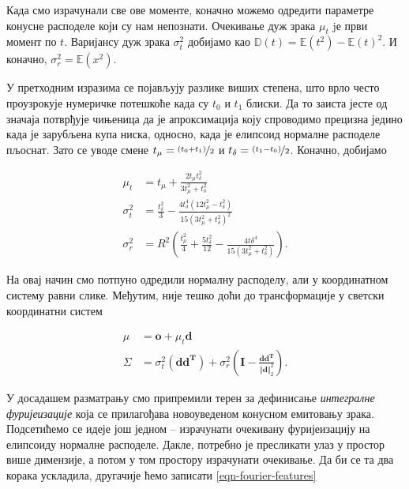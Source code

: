 \documentclass[12pt, a4paper, twoside]{book}
\numberwithin{equation}{chapter}
\numberwithin{theorem}{section}
\numberwithin{definition}{section}
\numberwithin{definitionChapter}{chapter}
\begin{document}
Када смо израчунали све ове моменте, коначно можемо одредити параметре конусне расподеле који су нам непознати.
Очекивање дуж зрака $\mu_t$ jе први момент по $t$. Варијансу дуж зрака $\sigma_t^2$ добијамо
као $\mathbb{D}(t) = \mathbb{E}(t^2) - \mathbb{E}(t)^2$. И коначно, $\sigma_r^2 = \mathbb{E}(x^2)$.

У претходним изразима се појављују разлике виших степена, што врло често проузрокује нумеричке потешкоће
када су $t_0$ и $t_1$ блиски. Да то заиста јесте од значаја потврђује чињеница да је апроксимација коју
спроводимо прецизна једино када је зарубљена купа ниска, односно, када је елипсоид нормалне расподеле пљоснат.
Зато се уводе смене $t_\mu = \nicefrac{(t_0 + t_1)}{2}$ и $t_\delta = \nicefrac{(t_1 - t_0)}{2}$.
Коначно, добијамо

\begin{equation}
	\begin{split}
		\mu_t & = t_\mu + \frac{2t_\mu t_\delta^2}{3t_\mu^2 + t_\delta^2} \\
		\sigma_t^2 & = \frac{t_\delta^2}{3} - \frac{4t_\delta^4(12t_\mu^2 - t_\delta^2)}{15(3t_\mu^2 + t_\delta^2)^2} \\
		\sigma_r^2 & = R^2 \left(\frac{t_\mu^2}{4} + \frac{5t_\delta^2}{12} - \frac{4t\delta^4}{15(3t_\mu^2 + t_\delta^2)}\right).
	\end{split}
\end{equation}

На овај начин смо потпуно одредили нормалну расподелу, али у координатном систему равни слике. Међутим,
није тешко доћи до трансформације у светски координатни систем

\begin{equation}
	\begin{split}
		\mu & = \mathbf{o} + \mu_t\mathbf{d} \\
		\Sigma & = \sigma_t^2\left(\mathbf{d}\mathbf{d^T}\right) +
			\sigma_r^2\left(\mathbf{I} - \frac{\mathbf{d}\mathbf{d^T}}{\Vert \mathbf{d}\Vert_2^2}\right).
	\end{split}
\end{equation}

У досадашем разматрању смо припремили терен за дефинисање \textit{интегралне фуријеизације} која се
прилагођава новоуведеном конусном емитовању зрака. Подсетићемо се идеје још једном -- израчунати очекивану
фуријеизацију на елипсоиду нормалне расподеле. Дакле, потребно је пресликати улаз у простор више димензије,
а потом у том простору израчунати очекивање. Да би се та два корака ускладила, другачије ћемо записати
\ref{eqn-fourier-features}
\end{document}
